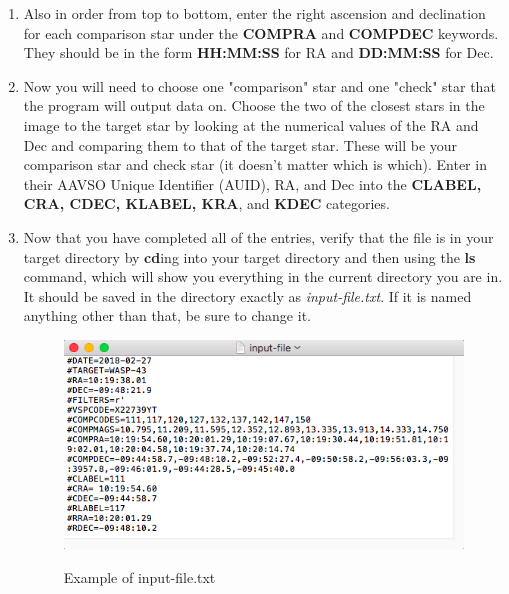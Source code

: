 \documentclass[11pt]{report}
\begin{document}
\begin{enumerate}
\item Also in order from top to bottom, enter the right ascension and declination for each comparison star under the {\bf COMPRA} and {\bf COMPDEC} keywords. They should be in the form {\bf HH:MM:SS} for RA and {\bf DD:MM:SS} for Dec.
\item Now you will need to choose one "comparison" star and one "check" star that the program will output data on. Choose the two of the closest stars in the image to the target star by looking at the numerical values of the RA and Dec and comparing them to that of the target star. These will be your comparison star and check star (it doesn't matter which is which). Enter in their AAVSO Unique Identifier (AUID), RA, and Dec into the {\bf CLABEL, CRA, CDEC, KLABEL, KRA}, and {\bf KDEC} categories. 
\item Now that you have completed all of the entries, verify that the file is in your target directory by {\bf cd}ing into your target directory and then using the {\bf ls} command, which will show you everything in the current directory you are in. It should be saved in the directory exactly as \emph{input-file.txt}. If it is named anything other than that, be sure to change it. 
\begin{figure}[!h]
\begin{center}
\includegraphics[totalheight=.3\textheight]{example.png}
\end{center}
\begin{center}
\small{Example of input-file.txt}
\end{center}
\end{figure}
\end{enumerate}
\end{document}
